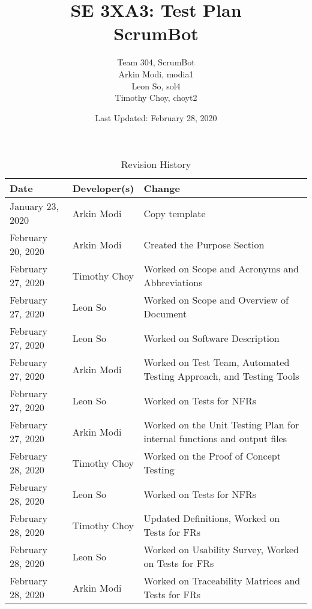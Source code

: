 \documentclass[12pt, titlepage]{article}
\title{SE 3XA3: Test Plan\\ScrumBot}
\author{
	Team 304, ScrumBot
		\\ Arkin Modi, modia1
        \\ Leon So, sol4
        \\ Timothy Choy, choyt2
}
\date{Last Updated: February 28, 2020}
\begin{document}
\newpage
\maketitle

\tableofcontents
\listoftables
\listoffigures

\newpage

\begin{table}[!hbp]
    \caption{Revision History} \label{TblRevisionHistory}
    \begin{tabularx}{\textwidth}{llX}
        \toprule
            \textbf{Date} & \textbf{Developer(s)} & \textbf{Change}\\
        \midrule
            January 23, 2020 & Arkin Modi & Copy template\\
            February 20, 2020 & Arkin Modi & Created the Purpose Section\\
            February 27, 2020 & Timothy Choy & Worked on Scope and Acronyms and Abbreviations\\
            February 27, 2020 & Leon So & Worked on Scope and Overview of Document\\
            February 27, 2020 & Leon So & Worked on Software Description\\
            February 27, 2020 & Arkin Modi & Worked on Test Team, Automated Testing Approach, and Testing Tools\\
            February 27, 2020 & Leon So & Worked on Tests for NFRs\\
            February 27, 2020 & Arkin Modi & Worked on the Unit Testing Plan for internal functions and output files\\
            February 28, 2020 & Timothy Choy & Worked on the Proof of Concept Testing\\
            February 28, 2020 & Leon So & Worked on Tests for NFRs\\
            February 28, 2020 & Timothy Choy & Updated Definitions, Worked on Tests for FRs\\
            February 28, 2020 & Leon So & Worked on Usability Survey, Worked on Tests for FRs\\
            February 28, 2020 & Arkin Modi & Worked on Traceability Matrices and Tests for FRs\\
        \bottomrule
    \end{tabularx}
\end{table}


\newpage
\end{document}
